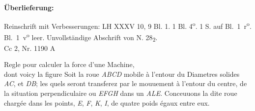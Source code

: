 \begin{ledgroupsized}[r]{120mm}
\footnotesize 
\pstart    
\noindent\textbf{\"{U}berlieferung:} 
\pend
\end{ledgroupsized}
\begin{ledgroupsized}[r]{114mm}
\footnotesize 
\pstart \parindent -6mm
%
Reinschrift mit Verbesserungen: LH XXXV 10, 9 Bl. 1. 1 Bl. 4\textsuperscript{o}. 1 S. auf Bl.~1~r\textsuperscript{o}. Bl.~1~v\textsuperscript{o} leer. Unvollständige Abschrift von N. 28\textsubscript{2}.
\\ 
Cc 2, Nr. 1190 A
\pend
\end{ledgroupsized}
\count{}
\vspace*{8mm}
\pstart 
\normalsize
\noindent
[1~r\textsuperscript{o}]
\pend
\pstart
\centering
\noindent
Regle pour calculer la force d'une Machine,\protect{}\protect{}\\%
dont voicy la figure
\pend
\vspace{1.0em}
\pstart
\noindent
Soit la roue\protect{} \textit{ABCD} mobile \`{a} l'entour du   Diametres\protect{} solides \textit{AC}, et \textit{DB}; les quels seront transferez par le mouuement\protect{} \`{a} l'entour du centre, de la situation perpendiculaire ou  \textit{EFGH} dans un  \textit{ALE}. Conceuuons la dite roue charg\'{e}e dans les points, \textit{E}, \textit{F}, \textit{K}, \textit{I}, de quatre poids \'{e}gaux entre eux.
\pend
\vspace{1.5em}
\pstart
\centering
